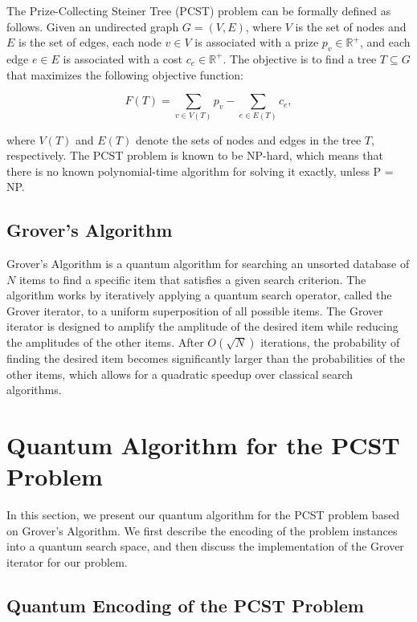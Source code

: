 The Prize-Collecting Steiner Tree (PCST) problem can be formally defined as follows. Given an undirected graph $G=(V, E)$, where $V$ is the set of nodes and $E$ is the set of edges, each node $v \in V$ is associated with a prize $p_v \in \mathbb{R}^+$, and each edge $e \in E$ is associated with a cost $c_e \in \mathbb{R}^+$. The objective is to find a tree $T \subseteq G$ that maximizes the following objective function:

\begin{equation}
\label{eq:objective}
F(T) = \sum_{v \in V(T)} p_v - \sum_{e \in E(T)} c_e,
\end{equation}

where $V(T)$ and $E(T)$ denote the sets of nodes and edges in the tree $T$, respectively. The PCST problem is known to be NP-hard, which means that there is no known polynomial-time algorithm for solving it exactly, unless P = NP.

\subsection{Grover's Algorithm}

Grover's Algorithm is a quantum algorithm for searching an unsorted database of $N$ items to find a specific item that satisfies a given search criterion. The algorithm works by iteratively applying a quantum search operator, called the Grover iterator, to a uniform superposition of all possible items. The Grover iterator is designed to amplify the amplitude of the desired item while reducing the amplitudes of the other items. After $O(\sqrt{N})$ iterations, the probability of finding the desired item becomes significantly larger than the probabilities of the other items, which allows for a quadratic speedup over classical search algorithms.

\section{Quantum Algorithm for the PCST Problem}
\label{sec:algorithm}

In this section, we present our quantum algorithm for the PCST problem based on Grover's Algorithm. We first describe the encoding of the problem instances into a quantum search space, and then discuss the implementation of the Grover iterator for our problem.

\subsection{Quantum Encoding of the PCST Problem}

